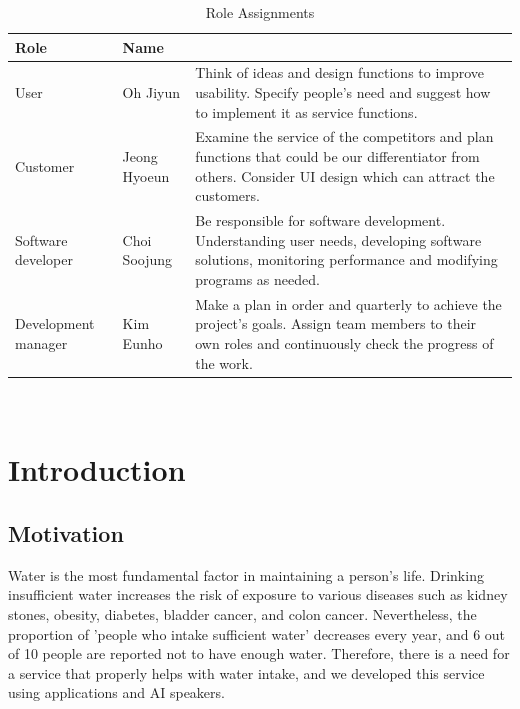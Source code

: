 \documentclass[conference]{IEEEtran}
\begin{document}
\begin{table}[ht!] \renewcommand\arraystretch{1.25}
  \begin{threeparttable}
      \caption{Role Assignments%
      \label{tab:table1}}    %
      \begin{tabular}{@{}l l>{\raggedright\arraybackslash}p{3.8cm}@{}}
      \toprule
      \bfseries Role & \bfseries Name & \multicolumn{1}{l}{\bfseries Task description and etc.} \\
      \midrule
      User & Oh Jiyun & Think of ideas and design functions to improve usability. Specify people's need and suggest how to implement it as service functions. \\
      Customer & Jeong Hyoeun & Examine the service of the competitors and plan functions that could be our differentiator from others. Consider UI design which can attract the customers. \\
      Software developer & Choi Soojung & Be responsible for software development. Understanding user needs, developing software solutions, monitoring performance and modifying programs as needed. \\
      Development manager & Kim Eunho & Make a plan in order and quarterly to achieve the project's goals. Assign team members to their own roles and continuously check the progress of the work. \\
      \bottomrule
      \end{tabular}
  \end{threeparttable}
\end{table}

\ 

\section{Introduction}

\subsection{Motivation}\label{AA}
\setlength{\parindent}{2ex}
Water is the most fundamental factor in maintaining a person's life. Drinking insufficient water increases the risk of exposure to various diseases such as kidney stones, obesity, diabetes, bladder cancer, and colon cancer. Nevertheless, the proportion of 'people who intake sufficient water' decreases every year, and 6 out of 10 people are reported not to have enough water. Therefore, there is a need for a service that properly helps with water intake, and we developed this service using applications and AI speakers.
\end{document}
